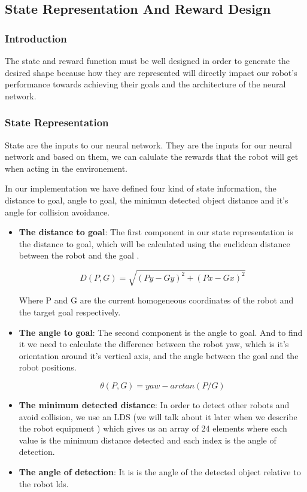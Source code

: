 \documentclass[12pt]{article}
\begin{document}
\subsection{State Representation And Reward Design}

\subsubsection{Introduction}
The state and reward function must be well designed in order to generate the desired shape because how they are represented will directly impact our robot's performance towards achieving their goals and the architecture of the neural network.


\subsubsection{State Representation}
State  are the inputs to our neural network. They are the inputs for our neural network and  based on them, we can  calulate  the rewards that the robot will get when acting in the environement.

In our implementation we have defined four kind  of state information, the distance to goal, angle to goal, the minimun detected object distance and it's angle for collision avoidance.



\pagebreak
\begin{itemize}
\item \textbf{The distance to goal}: 
The first component in our state representation is the distance to goal, which will be calculated using the euclidean distance  between the robot and the goal .


\[ D(P,G)=\sqrt{(Py-Gy)^2+(Px-Gx)^2}  \] 

Where P and G are the current homogeneous coordinates of the robot and the target goal respectively.

\item \textbf{The angle to goal}: 
The second component  is the angle  to goal. And to find it we need to calculate  the difference between the robot yaw, which is it's orientation around it's vertical axis, and the angle between the goal and the robot positions.


\[ \theta(P,G)=yaw-arctan(P/G)  \] 


\item \textbf{The minimum detected distance}: 
In order to detect other robots and avoid collision, we use an  LDS (we will talk about it later when we describe the robot equipment )  which gives us an array of 24 elements where each value is the minimum distance detected and each index is the angle of detection.


\item \textbf{The angle of detection}: 
It is is the angle of the detected object relative to the robot lds.



\end{itemize}
\end{document}
